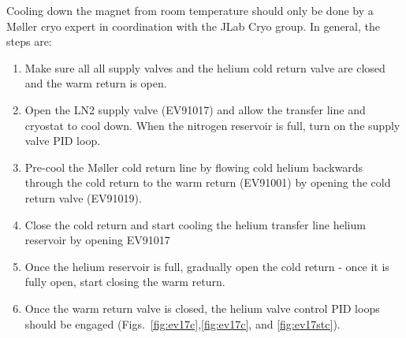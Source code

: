 {Cooling down the magnet from room temperature should only be done by a
M\o ller cryo expert in coordination with the JLab Cryo group. In
general, the steps are:
\begin{enumerate}
  \item{Make sure all all supply valves and the helium cold
        return valve are closed and the warm return is
        open.}
  \item{Open the LN2 supply valve (EV91017) and allow
        the transfer line and cryostat to cool down.  When the
        nitrogen reservoir is full, turn on the supply valve PID
        loop.}
  \item{Pre-cool the M\o ller cold return line by
        flowing cold helium backwards through the cold return to the
        warm return (EV91001) by opening the cold return valve
        (EV91019).}
  \item{Close the cold return and start cooling the
        helium transfer line helium reservoir by opening
        EV91017}
  \item{Once the helium reservoir is full, gradually
        open the cold return - once it is fully open, start closing
        the warm return.}
  \item{Once the warm return valve is closed,
        the helium valve control PID loops should be engaged
        (Figs.~\ref{fig:ev17c},\ref{fig:ev17c},
        and \ref{fig:ev17stc}).}
\end{enumerate}     
}
